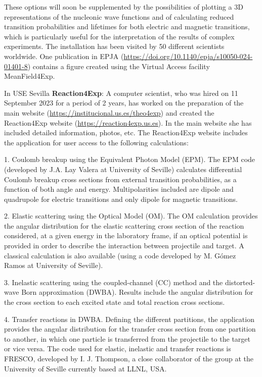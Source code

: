 These options will soon be supplemented by the possibilities of plotting a 3D representations of the nucleonic wave functions and of calculating reduced transition probabilities and lifetimes for both electric and magnetic transitions, which is particularly useful for the interpretation of the results of complex experiments. 
The installation has been visited by 50 different scientists worldwide. One publication in EPJA (\url{https://doi.org/10.1140/epja/s10050-024-01401-8}) contains a figure created using the Virtual Access facility MeanField4Exp.

In USE Sevilla \textbf{Reaction4Exp}: A computer scientist, who was hired on 11 September 2023 for a period of 2 years, has worked on the preparation of the main website (\url{https://institucional.us.es/theo4exp}) and  created the Reaction4Exp website (\url{https://reaction4exp.us.es}). In the main website she has included detailed information, photos, etc. The Reaction4Exp website includes the application for user access to the following calculations:

1. Coulomb breakup using the Equivalent Photon Model (EPM). The EPM code (developed by J.A. Lay Valera at University of Seville) calculates differential Coulomb breakup cross sections from external transition probabilities, as a function of both angle and energy. Multipolarities included are dipole and quadrupole for electric transitions and only dipole for magnetic transitions.

2. Elastic scattering using the Optical Model (OM). The OM calculation provides the angular distribution for the elastic scattering cross section of the reaction considered, at a given energy in the laboratory frame, if an optical potential is provided in order to describe the interaction between projectile and target. A classical calculation is also available (using a code developed by M. Gómez Ramos at University of Seville).

3. Inelastic scattering using the coupled-channel (CC) method and the distorted-wave Born approximation (DWBA). Results include the angular distribution for the cross section to each excited state and total reaction cross sections. 

4. Transfer reactions in DWBA. Defining the different partitions, the application provides the angular distribution for the transfer cross section from one partition to another, in which one particle is transferred from the projectile to the target or vice versa.
The code used for elastic, inelastic and transfer reactions is FRESCO, developed by I. J. Thompson, a close collaborator of the group at the University of Seville currently based at LLNL, USA.

